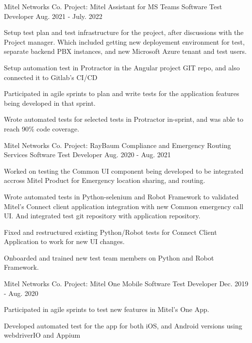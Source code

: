 \begin{cventries}
	\cventry
		{ Mitel Networks Co. } %
		{ Project: Mitel Assistant for MS Teams } %
		{ Software Test Developer } %
		{ Aug. 2021 - July. 2022 } %
		{
			\begin{cvitems} %
				\item { Setup test plan and test infrastructure for the project, after discussions with the Project manager. Which included getting new deployement environment for test, separate backend PBX instances, and new Microsoft Azure tenant and test users. } 
				\item { Setup automation test in Protractor in the Angular project GIT repo, and also connected it to Gitlab's CI/CD}
				\item { Participated in agile sprints to plan and write tests for the application features being developed in that sprint.
				}
				\item { Wrote automated tests for selected tests in Protractor in-sprint, and was able to reach 90\% code coverage.
				}
			\end{cvitems}
		}

	\cventry
		{ Mitel Networks Co. } %
		{ Project: RayBaum Compliance and Emergency Routing Services } %
		{ Software Test Developer } %
		{ Aug. 2020 - Aug. 2021 } %
		{
			\begin{cvitems} %
				\item { Worked on testing the Common UI component being developed to be integrated accross Mitel Product for Emergency location sharing, and routing. }
				\item { Wrote automated tests in Python-selenium and Robot Framework to validated Mitel's Connect client application integration with new Common emergency call UI. And integrated test git repository with application repository.
				}
				\item { Fixed and restructured existing Python/Robot tests for Connect Client Application to work for new UI changes.
				}
				\item { Onboarded and trained new test team members on Python and Robot Framework. }
			\end{cvitems}
		}

	\cventry
		{ Mitel Networks Co. } %
		{ Project: Mitel One Mobile } %
		{ Software Test Developer } %
		{ Dec. 2019 - Aug. 2020 } %
		{
			\begin{cvitems} %
				\item { Participated in agile sprints to test new features in Mitel's One App. }
				\item { Developed automated test for the app for both iOS, and Android versions using webdriverIO and Appium }
			\end{cvitems}
		}


\end{cventries}
